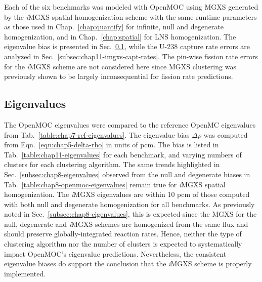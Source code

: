 Each of the six benchmarks was modeled with OpenMOC using \ac{MGXS} generated by the \textit{i}\ac{MGXS} spatial homogenization scheme with the same runtime parameters as those used in Chap.~\ref{chap:quantify} for infinite, null and degenerate homogenization, and in Chap.~\ref{chap:spatial} for \ac{LNS} homogenization. The eigenvalue bias is presented in Sec.~\ref{subsec:chap11-imgxs-eigenvalues}, while the U-238 capture rate errors are analyzed in Sec.~\ref{subsec:chap11-imgxs-capt-rates}. The pin-wise fission rate errors for the \textit{i}\ac{MGXS} scheme are not considered here since \ac{MGXS} clustering was previously shown to be largely inconsequential for fission rate predictions.

\subsection{Eigenvalues}
\label{subsec:chap11-imgxs-eigenvalues}

The OpenMOC eigenvalues were compared to the reference OpenMC eigenvalues from Tab.~\ref{table:chap7-ref-eigenvalues}. The eigenvalue bias $\Delta\rho$ was computed from Eqn.~\ref{eqn:chap5-delta-rho} in units of \ac{pcm}. The bias is listed in Tab.~\ref{table:chap11-eigenvalues} for each benchmark, and varying numbers of clusters for each clustering algorithm. The same trends highlighted in Sec.~\ref{subsec:chap8-eigenvalues} observed from the null and degenerate biases in Tab.~\ref{table:chap8-openmoc-eigenvalues} remain true for \textit{i}\ac{MGXS} spatial homogenization. The \textit{i}\ac{MGXS} eigenvalues are within 10 \ac{pcm} of those computed with both null and degenerate homogenization for all benchmarks. As previously noted in Sec.~\ref{subsec:chap8-eigenvalues}, this is expected since the \ac{MGXS} for the null, degenerate and \textit{i}\ac{MGXS} schemes are homogenized from the same flux and should preserve globally-integrated reaction rates. Hence, neither the type of clustering algorithm nor the number of clusters is expected to systematically impact OpenMOC's eigenvalue predictions. Nevertheless, the consistent eigenvalue biases do support the conclusion that the \textit{i}\ac{MGXS} scheme is properly implemented.

